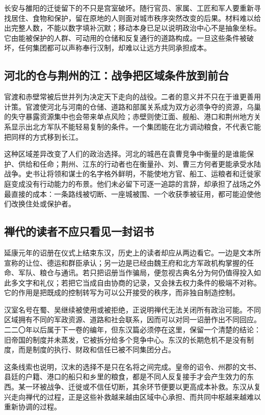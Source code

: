 长安与雒阳的迁徙留下的不只是宫室破坏。随行官员、家属、工匠和军人要重新寻找居住、食物和保护，留在原地的人则面对城市秩序突然改变的后果。材料难以给出完整人数，不能以数字填补沉默；移动本身已足以说明政治中心不是抽象坐标。它由能被保护的人群、可动用的仓储和反复通行的道路构成。一旦这些条件被破坏，任何集团都可以声称奉行汉制，却难以让远方共同承担成本。

\subsection{河北的仓与荆州的江：战争把区域条件放到前台}

官渡和赤壁常被后世并列为决定天下走向的战役。二者的意义并不只在于谁更善用计策。官渡使河北与河南的仓储、道路和部属关系成为双方必须争夺的资源，乌巢的失守暴露资源集中也会带来单点风险；赤壁则使江面、舰船、港口和荆州地方关系显示出北方军队不能轻易复制的条件。一个集团能在北方调动粮食，不代表它能把同样的方式移到长江。

这种区域差异改变了人们的政治选择。河北的城邑在袁曹竞争中衡量的是谁能保护、供给和任命；荆州、江东的行动者也在衡量孙、刘、曹三方何者更能承受水陆战争。史书让将领和谋士的名字格外鲜明，不能使地方官、船工、运粮者和迁徙家庭变成没有行动能力的布景。他们未必留下可逐一追踪的言辞，却承担了战场之外最直接的成本：一条路线被切断、一座城被围、一个收获季被征用，都可能迫使他们改换住处或保护者。

\subsection{禅代的读者不应只看见一封诏书}

延康元年的诏册在仪式上结束东汉，历史上的读者却应从两边看它。一边是文本所宣称的让位、德运和群臣承认；另一边是已经由魏王府和北方军政机构掌握的任命、军队、粮仓与通讯。若只把诏册当作骗局，便忽视古典名分为何仍值得投入如此多文字和礼仪；若把它当成自由协商的记录，又会抹去权力条件的极端不对称。它的作用是把既成的控制转写为可以公开接受的秩序，而非独自制造控制。

汉室名号在蜀、吴继续被使用或被拒绝，正说明禅代无法关闭所有政治可能。不同区域拥有不同的军政资源、道路和社会联系，因而可以对同一诏册作出不同回应。二二〇年以后属于下一卷的编年，但东汉篇必须停在这里，保留一个清楚的结论：旧帝国的制度并未蒸发，它被拆分给多个竞争中心。东汉的长期危机不是没有制度，而是制度的执行、财政和信任已被不同集团分占。

这条线索也说明，汉末的选择不是只在名将之间完成。皇帝的诏令、州郡的文书、县廷的户籍、港口的船只和乡里的粮食，都是不同人反复接手才会产生效力的东西。某一环被战争、迁徙或不信任切断，其余环节便要以更高成本补救。东汉从复兴走向禅代的过程，正是这些补救越来越由区域中心承担、而共同中枢越来越难以重新协调的过程。

